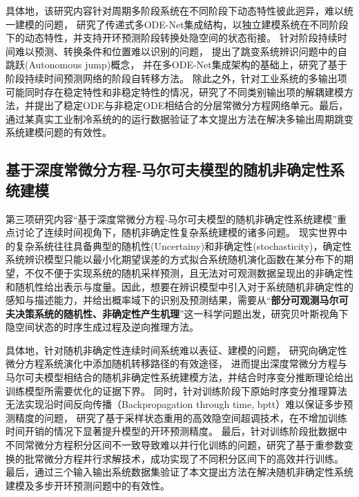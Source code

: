 具体地，该研究内容针对周期多阶段系统在不同阶段下动态特性彼此迥异，难以统一建模的问题，
研究了传递式多ODE-Net集成结构，以独立建模系统在不同阶段下的动态特性，并支持开环预测阶段转换处隐空间的状态衔接。
针对阶段持续时间难以预测、转换条件和位置难以识别的问题，
提出了跳变系统辨识问题中的自跳跃(Autonomous jump)概念，
并在多ODE-Net集成架构的基础上，研究了基于阶段持续时间预测网络的阶段自转移方法。
除此之外，针对工业系统的多输出项可能同时存在稳定特性和非稳定特性的情况，研究了不同类别输出项的解耦建模方法，并提出了稳定ODE与非稳定ODE相结合的分层常微分方程网络单元。最后，通过某真实工业制冷系统的的运行数据验证了本文提出方法在解决多输出周期跳变系统建模问题的有效性。


\subsection{基于深度常微分方程-马尔可夫模型的随机非确定性系统建模}

第三项研究内容“基于深度常微分方程-马尔可夫模型的随机非确定性系统建模”重点讨论了连续时间视角下，随机非确定性复杂系统建模的诸多问题。
现实世界中的复杂系统往往具备典型的随机性(Uncertainy)和非确定性(stochasticity)，确定性系统辨识模型只能以最小化期望误差的方式拟合系统随机演化函数在某分布下的期望，不仅不便于实现系统的随机采样预测，且无法对可观测数据呈现出的非确定性和随机性给出表示与度量。因此，想要在辨识模型中引入对于系统随机非确定性的感知与描述能力，并给出概率域下的识别及预测结果，需要从“\textbf{部分可观测马尔可夫决策系统的随机性、非确定性产生机理}”这一科学问题出发，研究贝叶斯视角下隐空间状态的时序生成过程及逆向推理方法。

具体地，针对随机非确定性连续时间系统难以表征、建模的问题，
研究向确定性微分方程系统演化中添加随机转移路径的有效途径，
进而提出深度常微分方程与马尔可夫模型相结合的随机非确定性系统建模方法，并结合时序变分推断理论给出训练模型所需要优化的证据下界。
同时，针对训练阶段下原始时序变分推理算法无法实现沿时间反向传播（Backpropagation through time, bptt）难以保证多步预测精度的问题，
研究了基于采样状态重用的高效隐空间超调技术，在不增加训练时间开销的情况下显著提升模型的开环预测精度。
最后，针对训练阶段批数据中不同常微分方程积分区间不一致导致难以并行化训练的问题，研究了基于重参数变换的批常微分方程并行求解技术，成功实现了不同积分区间下的高效并行训练。
最后，通过三个输入输出系统数据集验证了本文提出方法在解决随机非确定性系统建模及多步开环预测问题中的有效性。
